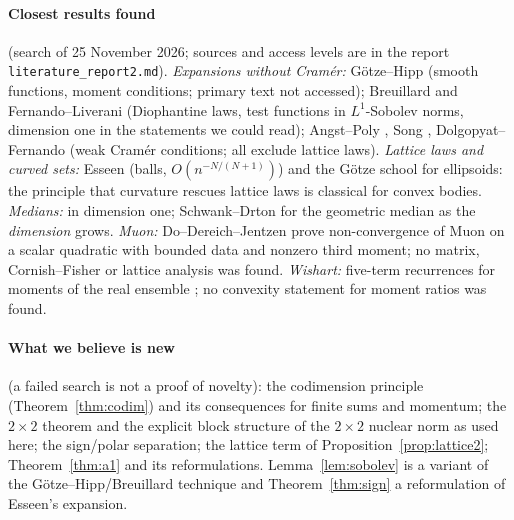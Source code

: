 \documentclass[10pt]{article}
\theoremstyle{definition}
\theoremstyle{remark}
\begin{document}
\paragraph{Closest results found} (search of 25 November 2026; sources and access levels are in the report
\texttt{literature\_report2.md}).
\emph{Expansions without Cram\'er:} G\"otze--Hipp \cite{gh} (smooth functions, moment conditions; primary text not
accessed); Breuillard \cite{breuillard} and Fernando--Liverani \cite{fl} (Diophantine laws, test functions in
$L^1$-Sobolev norms, dimension one in the statements we could read); Angst--Poly \cite{angstpoly}, Song \cite{song},
Dolgopyat--Fernando \cite{df} (weak Cram\'er conditions; all exclude lattice laws). \emph{Lattice laws and curved sets:}
Esseen \cite{esseen} (balls, $O(n^{-N/(N+1)})$) and the G\"otze school for ellipsoids: the principle that curvature
rescues lattice laws is classical for convex bodies. \emph{Medians:} \cite{bggh,kaas,hamza} in dimension one;
Schwank--Drton \cite{schwank} for the geometric median as the \emph{dimension} grows. \emph{Muon:} Do--Dereich--Jentzen
\cite{ddj} prove non-convergence of Muon on a scalar quadratic with bounded data and nonzero third moment; no matrix,
Cornish--Fisher or lattice analysis was found. \emph{Wishart:} five-term recurrences for moments of the real ensemble
\cite{cmos}; no convexity statement for moment ratios was found.

\paragraph{What we believe is new} (a failed search is not a proof of novelty): the codimension principle
(Theorem~\ref{thm:codim}) and its consequences for finite sums and momentum; the $2\times2$ theorem and the explicit
block structure of the $2\times2$ nuclear norm as used here; the sign/polar separation; the lattice term of
Proposition~\ref{prop:lattice2}; Theorem~\ref{thm:a1} and its reformulations. Lemma~\ref{lem:sobolev} is a variant of the
G\"otze--Hipp/Breuillard technique and Theorem~\ref{thm:sign} a reformulation of Esseen's expansion.
\end{document}
